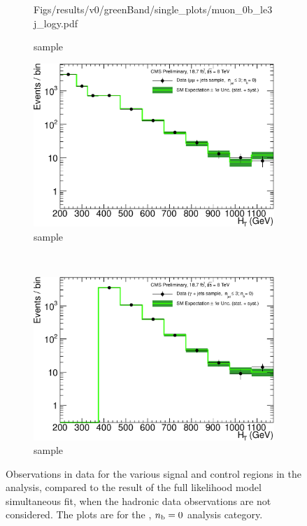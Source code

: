 \begin{figure}[h!]
\begin{subfigure}[b]{0.48\textwidth}
    {Figs/results/v0/greenBand/single_plots/muon_0b_le3j_logy.pdf}
    \caption{\mj sample}
  \end{subfigure}
  \begin{subfigure}[b]{0.48\textwidth}
    \includegraphics[width=\textwidth]
    {Figs/results/v0/greenBand/single_plots/mumu_0b_le3j_logy.pdf}
    \caption{\mmj sample}
  \end{subfigure}\\
  \begin{subfigure}[b]{0.48\textwidth}
    \includegraphics[width=\textwidth]
    {Figs/results/v0/greenBand/single_plots/photon_0b_le3j_logy.pdf}
    \caption{\gj sample}
  \end{subfigure}
  \caption{Observations in data for the various signal and control
  regions in the analysis, compared to the result of the full likelihood model
  simultaneous fit, when the hadronic data observations are not considered. The
  plots are for the \njlow, $n_{\text{b}} = 0$ analysis category.}
  \label{fig:green_fits_0b_le3j}
\end{figure}

